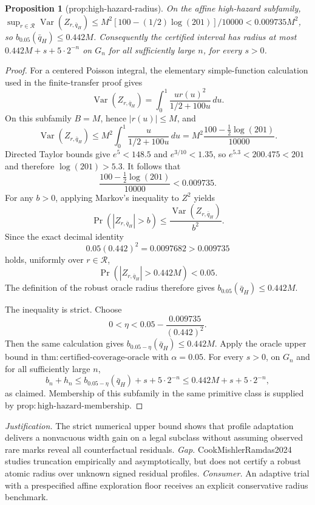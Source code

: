 \documentclass{article}
\newtheorem{proposition}{Proposition}
\begin{document}
\begin{proposition}[prop:high-hazard-radius]\label{prop:high-hazard-radius}
On the affine high-hazard subfamily, \(\sup_{r\in\mathcal R}\operatorname{Var}(Z_{r,\bar q_H})\le M^2[100-(1/2)\log(201)]/10000<0.009735M^2\), so \(b_{0.05}(\bar q_H)\le0.442M\). Consequently the certified interval has radius at most \(0.442M+s+5\cdot2^{-n}\) on \(G_n\) for all sufficiently large \(n\), for every \(s>0\).
\end{proposition}
\begin{proof}
For a centered Poisson integral, the elementary simple-function calculation used in the finite-transfer proof gives
\[
 \operatorname{Var}(Z_{r,\bar q_H})
 =\int_0^1\frac{u r(u)^2}{1/2+100u}\,du.
\]
On this subfamily \(B=M\), hence \(|r(u)|\leq M\), and
\[
 \operatorname{Var}(Z_{r,\bar q_H})
 \leq M^2\int_0^1\frac{u}{1/2+100u}\,du
 =M^2\frac{100-\frac12\log(201)}{10000}.
\]
Directed Taylor bounds give \(e^5<148.5\) and \(e^{3/10}<1.35\), so
\(e^{5.3}<200.475<201\) and therefore \(\log(201)>5.3\).  It follows that
\[
 \frac{100-\frac12\log(201)}{10000}
 <0.009735.
\]
For any \(b>0\), applying Markov's inequality to \(Z^2\) yields
\[
 \Pr(|Z_{r,\bar q_H}|>b)
 \leq\frac{\operatorname{Var}(Z_{r,\bar q_H})}{b^2}.
\]
Since the exact decimal identity
\[
 0.05(0.442)^2=0.0097682>0.009735
\]
holds, uniformly over \(r\in\mathcal R\),
\[
 \Pr(|Z_{r,\bar q_H}|>0.442M)<0.05.
\]
The definition of the robust oracle radius therefore gives
\(b_{0.05}(\bar q_H)\leq0.442M\).

The inequality is strict.  Choose
\[
 0<\eta<
 0.05-\frac{0.009735}{(0.442)^2}.
\]
Then the same calculation gives
\(b_{0.05-\eta}(\bar q_H)\leq0.442M\).
Apply the oracle upper bound in
\(\mathrm{thm:certified\mbox{-}coverage\mbox{-}oracle}\) with
\(\alpha=0.05\).  For every \(s>0\), on \(G_n\) and for all sufficiently large \(n\),
\[
 b_n+h_n
 \leq b_{0.05-\eta}(\bar q_H)+s+5\cdot2^{-n}
 \leq0.442M+s+5\cdot2^{-n},
\]
as claimed.  Membership of this subfamily in the same primitive class is supplied by
\(\mathrm{prop:high\mbox{-}hazard\mbox{-}membership}\).
\end{proof}
\par\smallskip\noindent \textit{Justification.} The strict numerical upper bound shows that profile adaptation delivers a nonvacuous width gain on a legal subclass without assuming observed rare marks reveal all counterfactual residuals. \textit{Gap.} CookMishlerRamdas2024 studies truncation empirically and asymptotically, but does not certify a robust atomic radius over unknown signed residual profiles. \textit{Consumer.} An adaptive trial with a prespecified affine exploration floor receives an explicit conservative radius benchmark.
\end{document}
